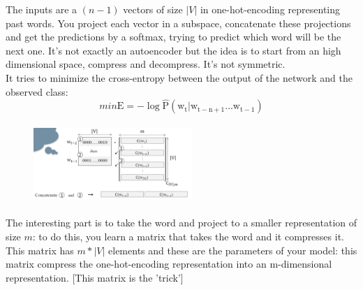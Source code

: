 The inputs are a $(n-1)$ vectors of size $|V|$ in one-hot-encoding representing past words. You project each vector in a subspace, concatenate these projections and get the predictions by a softmax, trying to predict which word will be the next one. It's not exactly an autoencoder but the idea is to start from an high dimensional space, compress and decompress. It's not symmetric. \\
It tries to minimize the cross-entropy between the output of the network and the observed class: 
$$
min \mathrm{E}=-\log \widehat{\mathrm{P}}\left(\mathrm{w}_{\mathrm{t}} | \mathrm{w}_{\mathrm{t}-\mathrm{n}+1} \ldots \mathrm{w}_{\mathrm{t}-1}\right)
$$

\begin{figure}
    \includegraphics[width=6cm, height=3cm]{images/emb_matrix.png}
\end{figure}  

The interesting part is to take the word and project to a smaller representation of size $m$: to do this, you learn a matrix that takes the word and it compresses it. \\
This matrix has $m*|V|$ elements and these are the parameters of your model: this matrix compress the one-hot-encoding representation into an m-dimensional representation. [This matrix is the 'trick']\\ 

